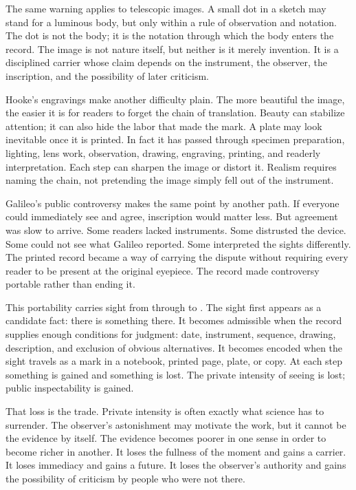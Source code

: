 The same warning applies to telescopic images. A small dot in a sketch
may stand for a luminous body, but only within a rule of observation and
notation. The dot is not the body; it is the notation through which the
body enters the record. The image is not nature itself, but neither is
it merely invention. It is a disciplined carrier whose claim depends on
the instrument, the observer, the inscription, and the possibility of
later criticism.

Hooke's engravings make another difficulty plain. The more beautiful the
image, the easier it is for readers to forget the chain of translation.
Beauty can stabilize attention; it can also hide the labor that made the
mark. A plate may look inevitable once it is printed. In fact it has
passed through specimen preparation, lighting, lens work, observation,
drawing, engraving, printing, and readerly interpretation. Each step can
sharpen the image or distort it. Realism requires naming the chain, not
pretending the image simply fell out of the instrument.

Galileo's public controversy makes the same point by another path. If
everyone could immediately see and agree, inscription would matter less.
But agreement was slow to arrive. Some readers lacked instruments. Some
distrusted the device. Some could not see what Galileo reported. Some
interpreted the sights differently. The printed record became a way of
carrying the dispute without requiring every reader to be present at the
original eyepiece. The record made controversy portable rather than
ending it.

This portability carries sight from  through 
to . The sight first appears as a candidate fact: there is
something there. It becomes admissible when the record supplies enough
conditions for judgment: date, instrument, sequence, drawing,
description, and exclusion of obvious alternatives. It becomes encoded
when the sight travels as a mark in a notebook, printed page, plate, or
copy. At each step something is gained and something is lost. The
private intensity of seeing is lost; public inspectability is gained.

That loss is the trade. Private intensity is often exactly what science
has to surrender. The observer's astonishment may motivate the work, but
it cannot be the evidence by itself. The evidence becomes poorer in one
sense in order to become richer in another. It loses the fullness of the
moment and gains a carrier. It loses immediacy and gains a future. It
loses the observer's authority and gains the possibility of criticism by
people who were not there.

